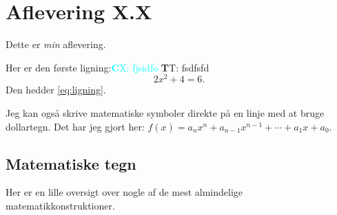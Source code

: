 \documentclass[a4paper,12pt,oneside,article]{memoir}
\newcommand{\TT}[1]{\textcolor{NavyBlue}{{\textbf TT: #1 }}}
\newcommand{\CX}[1]{\textcolor{Cyan}{{\textbf CX: #1 }}}
\begin{document}


\chapter*{Aflevering X.X} %

Dette er \emph{min} aflevering.

Her er den første ligning:\CX{fjsidfo}\TT{fsdfsfd}
\begin{equation}
	2x^2+4=6.\label{eq:ligning}
\end{equation}
Den hedder \eqref{eq:ligning}.

Jeg kan også skrive matematiske symboler direkte på en linje med at bruge dollartegn. Det har jeg gjort her: $f(x) = a_{n} x^{n} + a_{n-1}x^{n-1}+\cdots +a_{1}x + a_{0}$.

\section*{Matematiske tegn}
Her er en lille oversigt over nogle af de mest almindelige matematikkonstruktioner.
\end{document}
